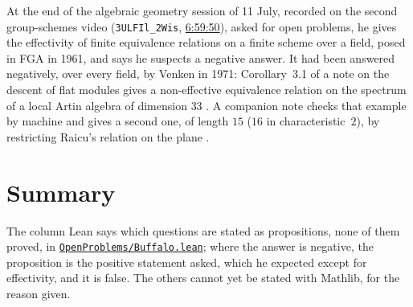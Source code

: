 \documentclass[11pt,a4paper]{amsart}
\theoremstyle{definition}
\theoremstyle{remark}
\newcommand{\ts}[3]{\href{https://www.youtube.com/watch?v=#1&t=#2}{#3}}
\begin{document}
At the end of the algebraic geometry session of 11 July, recorded on the second group-schemes video (\texttt{3ULFIl\_2Wis}, \ts{3ULFIl_2Wis}{6h59m50s}{6:59:50}), asked for open problems, he gives the effectivity of finite equivalence relations on a finite scheme over a field, posed in FGA in 1961, and says he suspects a negative answer. It had been answered negatively, over every field, by Venken in 1971: Corollary~3.1 of a note on the descent of flat modules gives a non-effective equivalence relation on the spectrum of a local Artin algebra of dimension $33$ \cite{venken}. A companion note checks that example by machine and gives a second one, of length $15$ ($16$ in characteristic~$2$), by restricting Raicu's relation on the plane \cite{effective}.

\section{Summary}

The column Lean says which questions are stated as propositions, none of them proved, in \href{https://github.com/Commutator-IO/GrothendieckArchivesProofs/blob/main/OpenProblems/Buffalo.lean}{\texttt{OpenProblems/\allowbreak Buffalo.lean}}; where the answer is negative, the proposition is the positive statement asked, which he expected except for effectivity, and it is false. The others cannot yet be stated with Mathlib, for the reason given.
\end{document}
